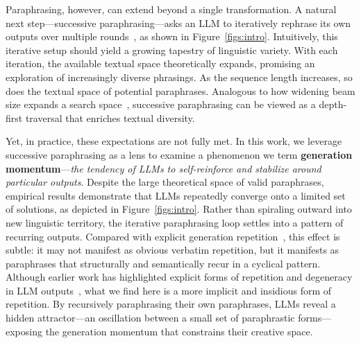 Paraphrasing, however, can extend beyond a single transformation. 
A natural next step—successive paraphrasing—asks an LLM to iteratively rephrase its own outputs over multiple rounds~\cite{can_ai,ship}, as shown in Figure~\ref{figs:intro}.
Intuitively, this iterative setup should yield a growing tapestry of linguistic variety. 
With each iteration, the available textual space theoretically expands, promising an exploration of increasingly diverse phrasings.
As the sequence length increases, so does the textual space of potential paraphrases.
Analogous to how widening beam size expands a search space~\cite{Holtzman2020The,huang-etal-2023-affective,meister-etal-2023-locally}, successive paraphrasing can be viewed as a depth-first traversal that enriches textual diversity.




Yet, in practice, these expectations are not fully met. 
In this work, we leverage successive paraphrasing as a lens to examine a phenomenon we term \textbf{generation momentum}—\textit{the tendency of LLMs to self-reinforce and stabilize around particular outputs}. 
Despite the large theoretical space of valid paraphrases, empirical results demonstrate that LLMs repeatedly converge onto a limited set of solutions, as depicted in Figure~\ref{figs:intro}. 
Rather than spiraling outward into new linguistic territory, the iterative paraphrasing loop settles into a pattern of recurring outputs. 
Compared with explicit generation repetition~\cite{see_get_2017,liu_text_2019,fu2020a}, this effect is subtle: it may not manifest as obvious verbatim repetition, but it manifests as paraphrases that structurally and semantically recur in a cyclical pattern. 
Although earlier work has highlighted explicit forms of repetition and degeneracy in LLM outputs~\cite{xu_learning_2022,yan2024understanding}, what we find here is a more implicit and insidious form of repetition. 
By recursively paraphrasing their own paraphrases, LLMs reveal a hidden attractor—an oscillation between a small set of paraphrastic forms—exposing the generation momentum that constrains their creative space.




